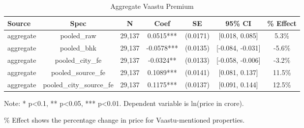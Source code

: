 \begin{table}[htbp]
\centering
\caption{Aggregate Vaastu Premium}
\begin{tabular}{lcccccc}
\toprule
Source & Spec & N & Coef & SE & 95\% CI & \% Effect \\
\midrule
aggregate & pooled_raw & 29,137 & 0.0515*** & (0.0171) & [0.018, 0.085] & 5.3\% \\
aggregate & pooled_bhk & 29,137 & -0.0578*** & (0.0135) & [-0.084, -0.031] & -5.6\% \\
aggregate & pooled_city_fe & 29,137 & -0.0324** & (0.0133) & [-0.058, -0.006] & -3.2\% \\
aggregate & pooled_source_fe & 29,137 & 0.1089*** & (0.0141) & [0.081, 0.137] & 11.5\% \\
aggregate & pooled_city_source_fe & 29,137 & 0.1175*** & (0.0137) & [0.091, 0.144] & 12.5\% \\
\bottomrule
\end{tabular}
\begin{tablenotes}
\small
\item Note: * p<0.1, ** p<0.05, *** p<0.01. Dependent variable is ln(price in crore).
\item \% Effect shows the percentage change in price for Vaastu-mentioned properties.
\end{tablenotes}
\end{table}